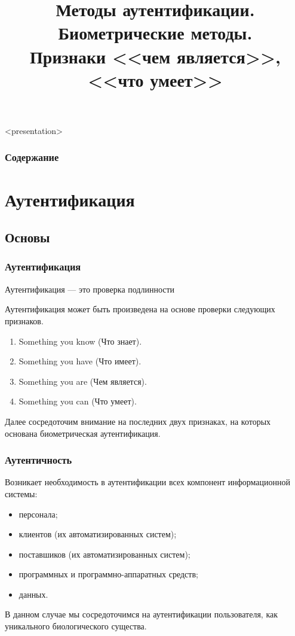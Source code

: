 
\title[Биометрическая аутентификация]{Методы аутентификации.\\Биометрические методы.\\Признаки <<чем является>>, <<что умеет>>}






\begin{frame}<presentation>
    \frametitle{Содержание}
    \tableofcontents
\end{frame}


\section{Аутентификация}


\subsection{Основы}


\begin{frame}
\frametitle{Аутентификация}
\begin{definition}%
\alert{Аутентификация} --- это проверка подлинности
\end{definition}
Аутентификация может быть произведена на основе проверки следующих признаков.
\begin{enumerate}
    \item Something you know (Что знает).
    \item Something you have (Что имеет).
    \item \alert{Something you are (Чем является)}.
    \item \alert{Something you can (Что умеет)}.
\end{enumerate}
Далее сосредоточим внимание на последних двух признаках, на которых основана биометрическая аутентификация.
\end{frame}


\begin{frame}
\frametitle{Аутентичность}
Возникает необходимость в аутентификации всех компонент информационной системы:
\begin{itemize}
    \item \alert{персонала};
    \item \alert{клиентов} (их автоматизированных систем);
    \item \alert{поставшиков} (их автоматизированных систем);
    \item программных и программно-аппаратных средств;
    \item данных.
\end{itemize}
В данном случае мы сосредоточимся на аутентификации \alert{пользователя}, как уникального биологического существа.
\end{frame}


